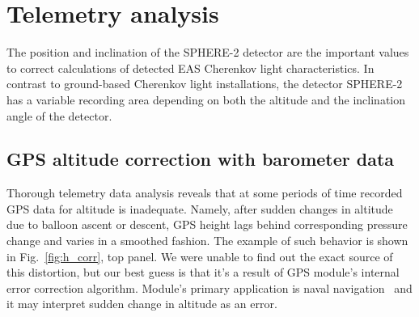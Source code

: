 \documentclass[final,5p,times,twocolumn]{elsarticle}
\begin{document}






\section{Telemetry analysis}

The position and inclination of the SPHERE-2 detector are the important values to correct calculations of detected EAS Cherenkov light characteristics. In contrast to ground-based Cherenkov light installations, the detector SPHERE-2 has a variable recording area depending on both the altitude and the inclination angle of the detector.

\subsection{GPS altitude correction with barometer data}
\label{sect:gps_correction}

Thorough telemetry data analysis reveals that at some periods of time recorded GPS data for altitude is inadequate. Namely, after sudden changes in altitude due to balloon ascent or descent, GPS height lags behind corresponding pressure change and varies in a smoothed fashion. The example of such behavior is shown in Fig.~\ref{fig:h_corr}, top panel. We were unable to find out the exact source of this distortion, but our best guess is that it's a result of GPS module's internal error correction algorithm. Module's primary application is naval navigation~\cite{GPS-module-specs} and it may interpret sudden change in altitude as an error.
\end{document}
